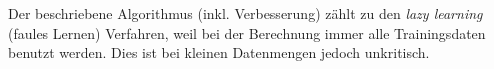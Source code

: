 Der beschriebene Algorithmus (inkl. Verbesserung) zählt zu den \textit{lazy learning} (faules Lernen) Verfahren, weil bei der Berechnung immer alle Trainingsdaten benutzt werden. Dies ist bei kleinen Datenmengen jedoch unkritisch.










